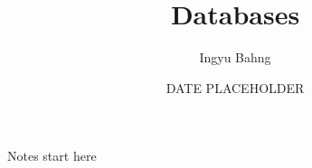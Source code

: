 \documentclass[10pt]{article}
\title{Databases}
\date{DATE PLACEHOLDER}
\author{Ingyu Bahng}
\begin{document}


Notes start here
  
\end{document}

